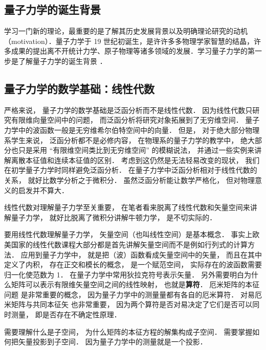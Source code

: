 
\begin{issues}
\issueTODO
\end{issues}
\subsection{量子力学的诞生背景}
学习一门新的理论，最重要的是了解其历史发展背景以及明确理论研究的动机（motivation）．量子力学于 19 世纪初诞生，是许许多多物理学家智慧的结晶，许多成果的提出离不开统计力学、原子物理等诸多领域的发展．学习量子力学的第一步是了解量子力学的诞生背景 ．

\subsection{量子力学的数学基础：线性代数}
严格来说， 量子力学的数学基础是泛函分析而不是线性代数． 因为线性代数只研究有限维向量空间中的问题， 而泛函分析将研究对象拓展到了无穷维空间． 量子力学中的波函数一般是无穷维希尔伯特空间中的向量． 但是， 对于绝大部分物理系学生来说， 泛函分析都不是必修内容， 在物理系的量子力学的教学中， 绝大部分也只是采用 “有限维空间类比到无穷维空间” 的模糊说法， 并通过一些实例来讲解离散本征值和连续本征值的区别． 考虑到这仍然是无法轻易改变的现状， 我们在初学量子力学时同样避免泛函分析． 在量子力学中泛函分析相对于线性代数的关系， 就好比数学分析之于微积分． 虽然泛函分析能让数学严格化， 但对物理意义的启发并不算大．

线性代数对理解量子力学至关重要， 在笔者看来脱离了线性代数和矢量空间来讲解量子力学， 就好比脱离了微积分讲解牛顿力学， 是不切实际的． 

要用线性代数理解量子力学， 矢量空间（也叫线性空间）是基本概念． 事实上欧美国家的线性代数课程大部分都是首先讲解矢量空间而不是例如行列式的计算方法． 应用到量子力学中， 就是把（波）函数看成矢量空间中的矢量， 而且在其中定义了内积， 存在正交和模长的概念， 是一个赋范空间， 实际存在的波函数需要归一化使范数为 1． 在量子力学中常用狄拉克符号表示矢量． 另外需要明白为什么矩阵可以表示有限维矢量空间之间的线性映射， 也就是\textbf{算符}． 厄米矩阵的本征问题 是非常重要的概念， 因为量子力学中的测量量都有各自的厄米算符． 对易厄米矩阵与共同本征矢 也非常重要， 因为两个算符是否对易决定了它们是否可以同时测量， 即是否存在不确定性原理．

需要理解什么是子空间， 为什么矩阵的本征方程的解集构成子空间． 需要掌握如何把矢量投影到子空间． 因为量子力学中的测量就是一个投影．

